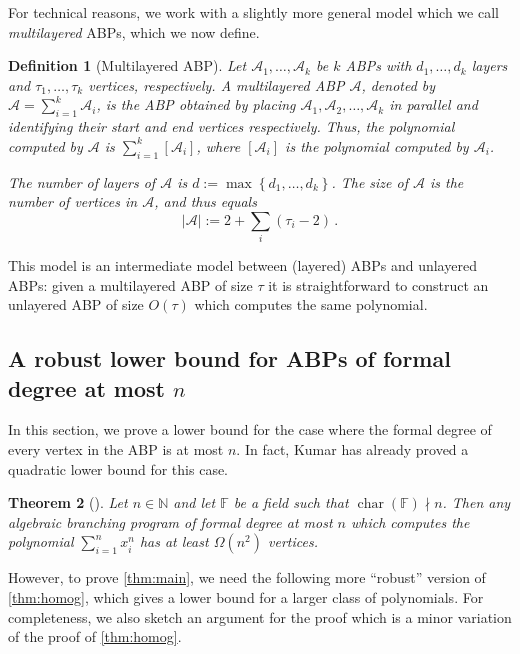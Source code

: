 \documentclass[10pt,a4paper]{article}
\newtheorem{theorem}{Theorem}
\newtheorem{definition}[theorem]{Definition}
\newcommand{\F}{\mathbb F}
\newcommand{\N}{\mathbb N}
\DeclareMathOperator{\Char}{char}
\newcommand{\set}[1]{\left\{#1\right\}}
\newcommand{\abs}[1]{\left|#1\right|}
\begin{document}
For technical reasons, we work with a slightly more general model which we call \emph{multilayered} ABPs, which we now define. 
	
\begin{definition}[Multilayered ABP]
	Let $\mathcal{A}_1, \ldots, \mathcal{A}_k$ be $k$ ABPs with $d_1, \ldots, d_k$ layers and $\tau_1, \ldots, \tau_k$ vertices, respectively. A multilayered ABP $\mathcal{A}$, denoted by $\mathcal{A} = \sum_{i = 1}^k \mathcal{A}_i$, is the ABP obtained by placing $\mathcal{A}_1, \mathcal{A}_2, \ldots, \mathcal{A}_k$ in parallel and identifying their start and end vertices respectively. Thus, the polynomial computed by $\mathcal{A}$ is $\sum_{i=1}^k [\mathcal{A}_i]$, where $ [\mathcal{A}_i]$ is the polynomial computed by $\mathcal{A}_i$. 
	
The number of layers of $\mathcal{A}$ is $d := \max \set{d_1, \ldots, d_k}$. The size of $\mathcal{A}$ is the number of vertices in $\mathcal{A}$, and thus equals  \[\abs{ \mathcal{A}} := 2 + \sum_i (\tau_i-2) \, .\] 
\end{definition}

This model is an intermediate model between (layered) ABPs and unlayered ABPs: given a multilayered ABP of size $\tau$ it is straightforward to construct an unlayered ABP of size $O(\tau)$ which computes the same polynomial. 	

	
\subsection{A robust lower bound for ABPs of formal degree at most $n$}
In this section, we prove a lower bound for the case where the formal degree of every vertex in the ABP is at most $n$. 
In fact, Kumar \cite{K19} has already proved a quadratic lower bound for this case.
	
\begin{theorem}[\cite{K19}]\label{thm:homog}
	Let $n \in \N$ and let $\F$ be a field such that $\Char(\F) \nmid n$. Then any algebraic branching program of formal degree at most $n$ which computes the polynomial $\sum_{i = 1}^n x_i^n$ has at least $\Omega(n^2)$ vertices. 
\end{theorem}
	
However, to prove \autoref{thm:main}, we need the following more ``robust'' version of \autoref{thm:homog}, which gives a lower bound for a larger class of polynomials. For completeness, we also sketch an argument for the proof which is a minor variation of the proof of \autoref{thm:homog}.
\end{document}

